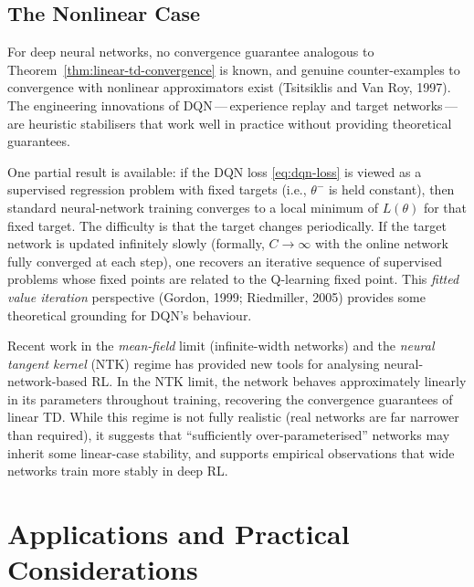 \subsection{The Nonlinear Case}

For deep neural networks, no convergence guarantee analogous to Theorem~\ref{thm:linear-td-convergence}
is known, and genuine counter-examples to convergence with nonlinear approximators exist
(Tsitsiklis and Van Roy, 1997).  The engineering innovations of DQN\,---\,experience replay and
target networks\,---\,are heuristic stabilisers that work well in practice without providing
theoretical guarantees.

One partial result is available: if the DQN loss \eqref{eq:dqn-loss} is viewed as a supervised
regression problem with fixed targets (i.e., $\theta^-$ is held constant), then standard
neural-network training converges to a local minimum of $L(\theta)$ for that fixed target.
The difficulty is that the target changes periodically.  If the target network is updated
infinitely slowly (formally, $C \to \infty$ with the online network fully converged at each
step), one recovers an iterative sequence of supervised problems whose fixed points are related
to the Q-learning fixed point.  This \emph{fitted value iteration}
perspective (Gordon, 1999; Riedmiller, 2005) provides some theoretical grounding for DQN's
behaviour.

\begin{remark}
\label{rem:mean-field}
Recent work in the \emph{mean-field} limit (infinite-width networks) and the \emph{neural tangent
kernel} (NTK) regime has provided new tools for analysing neural-network-based RL.  In the NTK
limit, the network behaves approximately linearly in its parameters throughout training, recovering
the convergence guarantees of linear TD.  While this regime is not fully realistic (real networks
are far narrower than required), it suggests that ``sufficiently over-parameterised'' networks may
inherit some linear-case stability, and supports empirical observations that wide networks train
more stably in deep RL.
\end{remark}

\section{Applications and Practical Considerations}
\label{sec:applications-vfa}

